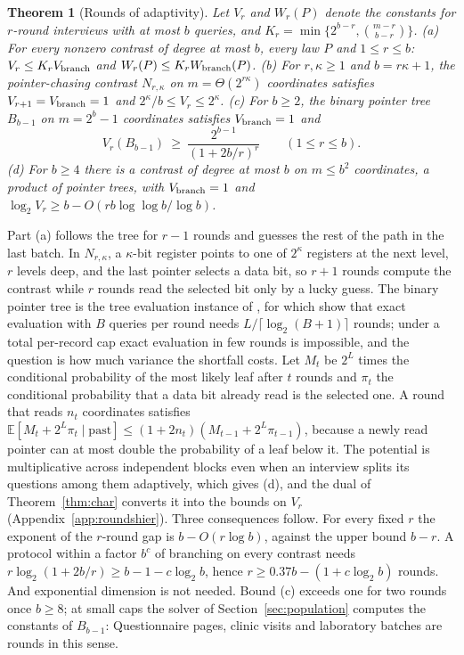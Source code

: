 \documentclass{article}
\newtheorem{theorem}{Theorem}
\newcommand{\E}{\mathbb{E}}
\begin{document}
\begin{theorem}[Rounds of adaptivity]\label{thm:rounds}
Let $V_r$ and $W_r(P)$ denote the constants for $r$-round interviews with at most $b$ queries, and $K_r=\min\{2^{b-r},\binom{m-r}{b-r}\}$.
\textup{(a)} For every nonzero contrast of degree at most $b$, every law $P$ and $1\le r\le b$: $V_r\le K_rV_{\rm branch}$ and $W_r(P)\le K_rW_{\rm branch}(P)$.
\textup{(b)} For $r,\kappa\ge1$ and $b=r\kappa+1$, the pointer-chasing contrast $N_{r,\kappa}$ on $m=\Theta(2^{r\kappa})$ coordinates satisfies $V_{r+1}=V_{\rm branch}=1$ and $2^\kappa/b\le V_r\le2^\kappa$.
\textup{(c)} For $b\ge2$, the binary pointer tree $B_{b-1}$ on $m=2^b-1$ coordinates satisfies $V_{\rm branch}=1$ and
\[
 V_r(B_{b-1})\ \ge\ \frac{2^{b-1}}{(1+2b/r)^{r}}\qquad(1\le r\le b).
\]
\textup{(d)} For $b\ge4$ there is a contrast of degree at most $b$ on $m\le b^2$ coordinates, a product of pointer trees, with $V_{\rm branch}=1$ and $\log_2V_r\ge b-O(rb\log\log b/\log b)$.
\end{theorem}

Part (a) follows the tree for $r-1$ rounds and guesses the rest of the path in the last batch. In $N_{r,\kappa}$, a $\kappa$-bit register points to one of $2^\kappa$ registers at the next level, $r$ levels deep, and the last pointer selects a data bit, so $r+1$ rounds compute the contrast while $r$ rounds read the selected bit only by a lucky guess. The binary pointer tree is the tree evaluation instance of \citet{cook2012}, for which \citet{li2026regex} show that exact evaluation with $B$ queries per round needs $L/\lceil\log_2(B+1)\rceil$ rounds; under a total per-record cap exact evaluation in few rounds is impossible, and the question is how much variance the shortfall costs. Let $M_t$ be $2^{L}$ times the conditional probability of the most likely leaf after $t$ rounds and $\pi_t$ the conditional probability that a data bit already read is the selected one. A round that reads $n_t$ coordinates satisfies $\E[M_t+2^L\pi_t\mid\text{past}]\le(1+2n_t)(M_{t-1}+2^L\pi_{t-1})$, because a newly read pointer can at most double the probability of a leaf below it. The potential is multiplicative across independent blocks even when an interview splits its questions among them adaptively, which gives (d), and the dual of Theorem~\ref{thm:char} converts it into the bounds on $V_r$ (Appendix~\ref{app:roundshier}). Three consequences follow. For every fixed $r$ the exponent of the $r$-round gap is $b-O(r\log b)$, against the upper bound $b-r$. A protocol within a factor $b^c$ of branching on every contrast needs $r\log_2(1+2b/r)\ge b-1-c\log_2b$, hence $r\ge0.37b-(1+c\log_2b)$ rounds. And exponential dimension is not needed. Bound (c) exceeds one for two rounds once $b\ge8$; at small caps the solver of Section~\ref{sec:population} computes the constants of $B_{b-1}$: \nPointerSentence{} Questionnaire pages, clinic visits and laboratory batches are rounds in this sense.
\end{document}
